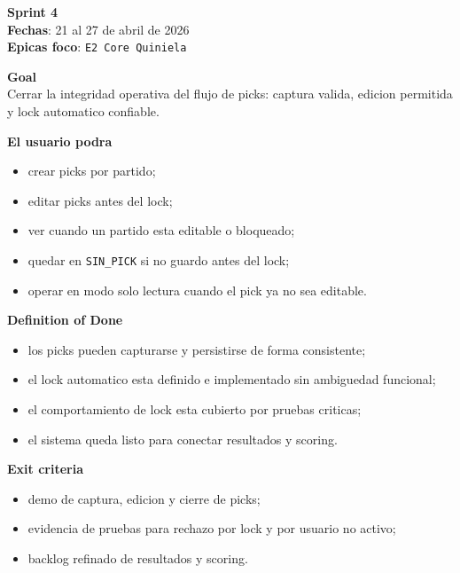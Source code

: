 \begin{docnote}
\textbf{Sprint 4}\\
\textbf{Fechas}: 21 al 27 de abril de 2026\\
\textbf{Epicas foco}: \texttt{E2 Core Quiniela}

\textbf{Goal}\\
Cerrar la integridad operativa del flujo de picks: captura valida, edicion permitida y lock automatico confiable.

\textbf{El usuario podra}\\
\begin{itemize}
  \item crear picks por partido;
  \item editar picks antes del lock;
  \item ver cuando un partido esta editable o bloqueado;
  \item quedar en \texttt{SIN\_PICK} si no guardo antes del lock;
  \item operar en modo solo lectura cuando el pick ya no sea editable.
\end{itemize}

\textbf{Definition of Done}\\
\begin{itemize}
  \item los picks pueden capturarse y persistirse de forma consistente;
  \item el lock automatico esta definido e implementado sin ambiguedad funcional;
  \item el comportamiento de lock esta cubierto por pruebas criticas;
  \item el sistema queda listo para conectar resultados y scoring.
\end{itemize}

\textbf{Exit criteria}\\
\begin{itemize}
  \item demo de captura, edicion y cierre de picks;
  \item evidencia de pruebas para rechazo por lock y por usuario no activo;
  \item backlog refinado de resultados y scoring.
\end{itemize}
\end{docnote}

